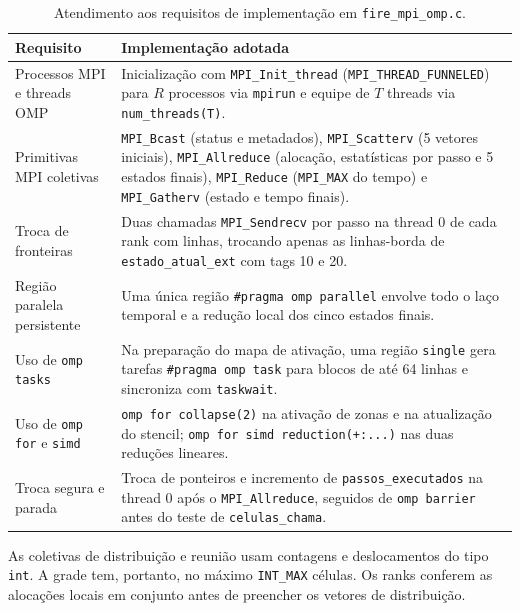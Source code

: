 \documentclass[12pt,a4paper]{article}
\begin{document}
\begin{table}[H]
    \centering
    \caption{Atendimento aos requisitos de implementação em \texttt{fire\_mpi\_omp.c}.}
    \label{tab:requisitos-tb2}
    \small
    \begin{tabular}{>{\raggedright\arraybackslash}p{4.1cm}>{\raggedright\arraybackslash}p{9.9cm}}
        \toprule
        Requisito & Implementação adotada \\
        \midrule
        Processos MPI e threads OMP & Inicialização com \texttt{MPI\_Init\_thread} (\texttt{MPI\_THREAD\_FUNNELED}) para $R$ processos via \texttt{mpirun} e equipe de $T$ threads via \texttt{num\_threads(T)}. \\
        Primitivas MPI coletivas & \texttt{MPI\_Bcast} (status e metadados), \texttt{MPI\_Scatterv} (5 vetores iniciais), \texttt{MPI\_Allreduce} (alocação, estatísticas por passo e 5 estados finais), \texttt{MPI\_Reduce} (\texttt{MPI\_MAX} do tempo) e \texttt{MPI\_Gatherv} (estado e tempo finais). \\
        Troca de fronteiras & Duas chamadas \texttt{MPI\_Sendrecv} por passo na thread 0 de cada rank com linhas, trocando apenas as linhas-borda de \texttt{estado\_atual\_ext} com tags 10 e 20. \\
        Região paralela persistente & Uma única região \texttt{\#pragma omp parallel} envolve todo o laço temporal e a redução local dos cinco estados finais. \\
        Uso de \texttt{omp tasks} & Na preparação do mapa de ativação, uma região \texttt{single} gera tarefas \texttt{\#pragma omp task} para blocos de até 64 linhas e sincroniza com \texttt{taskwait}. \\
        Uso de \texttt{omp for} e \texttt{simd} & \texttt{omp for collapse(2)} na ativação de zonas e na atualização do stencil; \texttt{omp for simd reduction(+:...)} nas duas reduções lineares. \\
        Troca segura e parada & Troca de ponteiros e incremento de \texttt{passos\_executados} na thread 0 após o \texttt{MPI\_Allreduce}, seguidos de \texttt{omp barrier} antes do teste de \texttt{celulas\_chama}. \\
        \bottomrule
    \end{tabular}
\end{table}

As coletivas de distribuição e reunião usam contagens e deslocamentos do tipo \texttt{int}. A grade tem, portanto, no máximo \texttt{INT\_MAX} células. Os ranks conferem as alocações locais em conjunto antes de preencher os vetores de distribuição.
\end{document}

